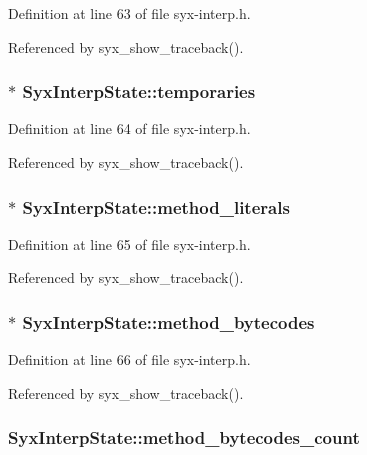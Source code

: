 Definition at line 63 of file syx-interp.h.

Referenced by syx\_\-show\_\-traceback().\hypertarget{struct_syx_interp_state_eafb29afefa1d6ff179eb668e4ff5759}{
\subsubsection{$\ast$ {\bf SyxInterpState::temporaries}}}
\label{struct_syx_interp_state_eafb29afefa1d6ff179eb668e4ff5759}




Definition at line 64 of file syx-interp.h.

Referenced by syx\_\-show\_\-traceback().\hypertarget{struct_syx_interp_state_dfb509f8e062636815ea466b4af1524e}{
\subsubsection{$\ast$ {\bf SyxInterpState::method\_\-literals}}}
\label{struct_syx_interp_state_dfb509f8e062636815ea466b4af1524e}




Definition at line 65 of file syx-interp.h.

Referenced by syx\_\-show\_\-traceback().\hypertarget{struct_syx_interp_state_b33dbca8378dfa3df5a770d07e1c206f}{
\subsubsection{$\ast$ {\bf SyxInterpState::method\_\-bytecodes}}}
\label{struct_syx_interp_state_b33dbca8378dfa3df5a770d07e1c206f}




Definition at line 66 of file syx-interp.h.

Referenced by syx\_\-show\_\-traceback().\hypertarget{struct_syx_interp_state_0c12712f19d50177cd7ace06975da5cd}{
\subsubsection{ {\bf SyxInterpState::method\_\-bytecodes\_\-count}}}
\label{struct_syx_interp_state_0c12712f19d50177cd7ace06975da5cd}





